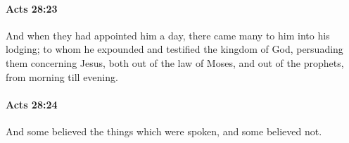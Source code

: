 		\paragraph{Acts 28:23} %
			\label{ACTS-28-23}

			And when they had appointed him a day, there came many to him into his lodging; to whom he expounded and testified the kingdom of God, persuading them concerning Jesus, both out of the law of Moses, and out of the prophets, from morning till evening.

			\begin{framed}
			\scriptsize
				\begin{compactdesc}
					\item[SBLG] 
				\end{compactdesc}
			\end{framed}

		\paragraph{Acts 28:24} %
			\label{ACTS-28-24}

			And some believed the things which were spoken, and some believed not.

